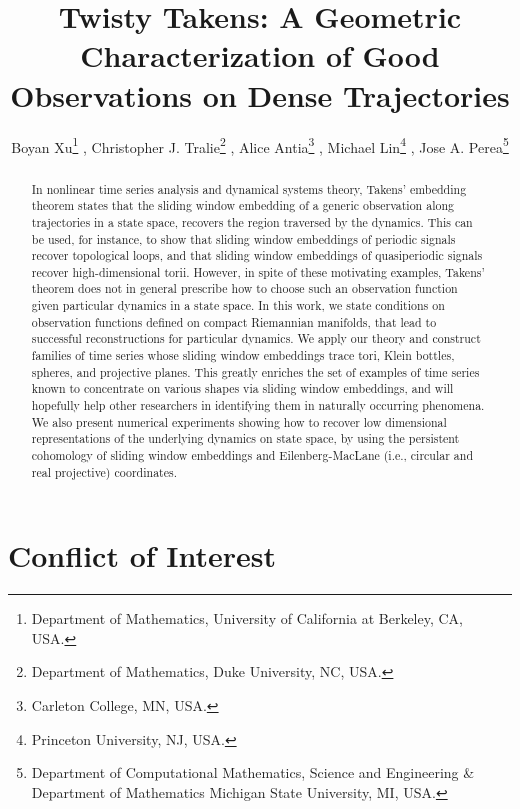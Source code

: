 \documentclass[11pt]{article}
\theoremstyle{definition}
\theoremstyle{remark}
\begin{document}
    \title{Twisty Takens: A Geometric Characterization of Good Observations on Dense Trajectories}
    \author{
    Boyan Xu\thanks{Department of Mathematics, University of California at Berkeley, CA, USA.} ,
    Christopher J. Tralie\thanks{Department of Mathematics, Duke University, NC, USA.} ,
    Alice Antia\thanks{Carleton College, MN, USA.} ,
    Michael Lin\thanks{Princeton University, NJ, USA.} ,
    Jose A. Perea\thanks{Department of Computational Mathematics, Science and Engineering \& Department of Mathematics Michigan State University, MI, USA.}
    }
    \maketitle

        \begin{abstract}

        In nonlinear time series analysis and dynamical systems theory, Takens' embedding theorem states that the sliding window embedding of a generic observation along trajectories in a state space, recovers the region traversed by the dynamics. This can be used, for instance, to show that sliding window embeddings of periodic signals recover topological loops, and that sliding window embeddings of quasiperiodic signals recover high-dimensional torii. However, in spite of these motivating examples, Takens' theorem does not in general prescribe how to choose such an observation function given particular dynamics in a state space. In this work, we state conditions on observation functions defined on compact Riemannian manifolds, that lead to successful reconstructions for particular dynamics. We apply our theory and construct families of time series whose sliding window embeddings trace tori, Klein bottles, spheres, and projective planes. This greatly enriches the set of examples of time series  known to concentrate on various shapes via sliding window embeddings, and will hopefully help other researchers in identifying them in naturally occurring phenomena. We also present numerical experiments showing how to recover low dimensional representations of the underlying dynamics on state space, by using the persistent cohomology of sliding window embeddings and Eilenberg-MacLane (i.e., circular and real projective) coordinates.
        \end{abstract}

\section*{Conflict of Interest}
\end{document}
